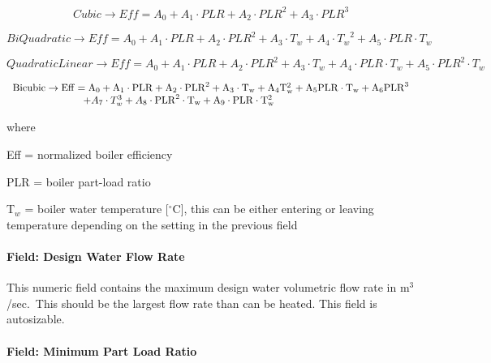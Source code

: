 \begin{equation}
    Cubic \to Eff = {A_0} + {A_1}\cdot PLR + {A_2}\cdot PL{R^2} + {A_3}\cdot PL{R^3}
\end{equation}

\begin{equation}
    BiQuadratic \to Eff = {A_0} + {A_1}\cdot PLR + {A_2}\cdot PL{R^2} + {A_3}\cdot {T_w} + {A_4}\cdot {T_w}^2 + {A_5}\cdot PLR\cdot {T_w}
\end{equation}

\begin{equation}
    QuadraticLinear \to Eff = {A_0} + {A_1}\cdot PLR + {A_2}\cdot PL{R^2} + {A_3}\cdot {T_w} + {A_4}\cdot PLR\cdot {T_w} + {A_5}\cdot PL{R^2}\cdot {T_w}
\end{equation}

\begin{equation}
    \begin{array}{l}
        \rm{Bicubic} \to \rm{Eff} = A_0 + A_1 \cdot \rm{PLR} + A_2 \cdot \rm{PLR}^2 + A_3 \cdot T_w + A_4 T_w^2 + A_5 \rm{PLR} \cdot T_w + A_6 \rm{PLR}^3 \\
        \quad \quad \quad \quad \quad \quad \quad  + A_7 \cdot T_w^3 + A_8 \cdot \rm{PLR}^2 \cdot T_w + A_9 \cdot \rm{PLR} \cdot T_w^2
    \end{array}
\end{equation}

where

Eff = normalized boiler efficiency

PLR = boiler part-load ratio

T\(_{w}\) = boiler water temperature {[}$^\circ$C{]}, this can be either entering or leaving temperature depending on the setting in the previous field

\paragraph{Field: Design Water Flow Rate}\label{field-design-water-flow-rate-001}

This numeric field contains the maximum design water volumetric flow rate in m\(^{3}\)/sec.~This should be the largest flow rate than can be heated. This field is autosizable.

\paragraph{Field: Minimum Part Load Ratio}\label{field-minimum-part-load-ratio-9}

